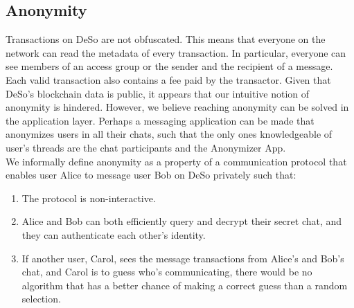 \documentclass[oneside, 12pt]{article}
\begin{document}
\subsection{Anonymity}
Transactions on DeSo are not obfuscated. This means that everyone on the network can read the metadata of every transaction. In particular, everyone can see members of an access group or the sender and the recipient of a message. Each valid transaction also contains a fee paid by the transactor. Given that DeSo’s blockchain data is public, it appears that our intuitive notion of anonymity is hindered. However, we believe reaching anonymity can be solved in the application layer. Perhaps a messaging application can be made that anonymizes users in all their chats, such that the only ones knowledgeable of user’s threads are the chat participants and the Anonymizer App.\\

\noindent We informally define anonymity as a property of a communication protocol that enables user Alice to message user Bob on DeSo privately such that:

\begin{enumerate}
  \item The protocol is non-interactive.
  \item Alice and Bob can both efficiently query and decrypt their secret chat, and they can authenticate each other’s identity.
  \item If another user, Carol, sees the message transactions from Alice’s and Bob’s chat, and Carol is to guess who’s communicating, there would be no algorithm that has a better chance of making a correct guess than a random selection.
\end{enumerate}
\end{document}
